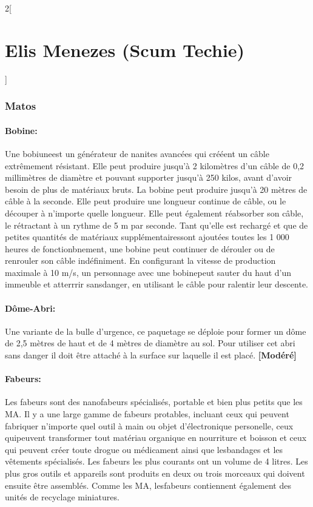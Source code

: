 \documentclass[a4paper,9pt]{article}
\begin{document}
\begin{multicols}{2}[\section*{Elis Menezes (Scum Techie)}]
   \subsubsection*{Matos}

   \paragraph{Bobine:} Une bobiuneest un générateur de nanites avancées qui
   crééent un câble extrêmement résistant. Elle peut produire jusqu'à 2
   kilomètres d'un câble de 0,2 millimètres de diamètre et pouvant supporter
   jusqu'à 250 kilos, avant d'avoir besoin de plus de matériaux bruts. La
   bobine peut produire jusqu'à 20 mètres de câble à la seconde. Elle peut
   produire une longueur continue de câble, ou le découper à n'importe quelle
   longueur. Elle peut également réabsorber son câble, le rétractant à un
   rythme de 5 m par seconde.  Tant qu'elle est rechargé et que de petites
   quantités de matériaux supplémentairessont ajoutées toutes les 1 000 heures
   de fonctionbnement, une bobine peut continuer de dérouler ou de renrouler
   son câble indéfiniment. En configurant la vitesse de production maximale à
   10 m/s, un personnage avec une bobinepeut sauter du haut d'un immeuble et
   atterrrir sansdanger, en utilisant le câble pour ralentir leur descente.

   \paragraph{Dôme-Abri:} Une variante de la bulle d'urgence, ce paquetage se
   déploie pour former un dôme de 2,5 mètres de haut et de 4 mètres de diamètre
   au sol.  Pour utiliser cet abri sans danger il doit être attaché à la
   surface sur laquelle il est placé. \textbf{[Modéré]} 

   \paragraph{Fabeurs:} Les fabeurs sont des nanofabeurs spécialisés, portable et
   bien plus petits que les MA. Il y a une large gamme de fabeurs protables,
   incluant ceux qui peuvent fabriquer n'importe quel outil à main ou objet
   d'électronique personelle, ceux quipeuvent transformer tout matériau
   organique en nourriture et boisson et ceux qui peuvent créer toute drogue ou
   médicament ainsi que lesbandages et les vêtements spécialisés. Les fabeurs
   les plus courants ont un volume de 4 litres. Les plus gros outils et
   appareils sont produits en deux ou trois morceaux qui doivent ensuite être
   assemblés. Comme les MA, lesfabeurs contiennent également des unités de
   recyclage miniatures.


\end{multicols}
\end{document}

